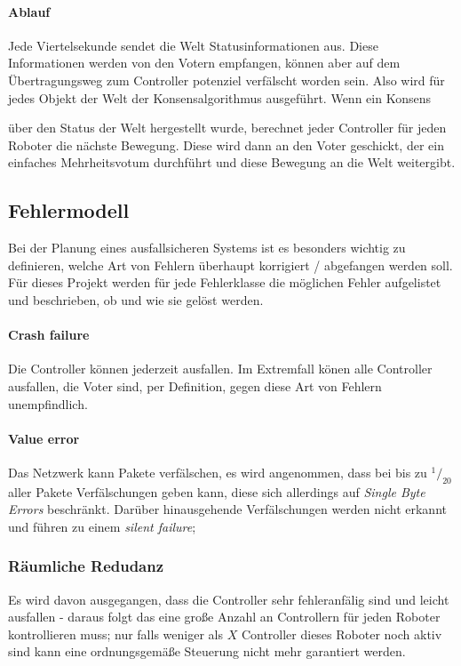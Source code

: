 \documentclass[
    12pt,
    bibliography=totoc,
    ngerman,
    enabledeprecatedfontcommands
]{scrartcl}
\begin{document}
\paragraph{Ablauf} Jede Viertelsekunde sendet die Welt Statusinformationen aus.  Diese Informationen werden von den Votern empfangen, k{\"{o}}nnen
aber auf dem {\"{U}}bertragungsweg zum Controller potenziel verf{\"{a}}lscht worden sein. Also wird f{\"{u}}r jedes Objekt der Welt der Konsensalgorithmus ausgef{\"{u}}hrt. Wenn ein Konsens {\"{u}ber den Status der Welt hergestellt wurde, berechnet 
jeder Controller f{\"{u}}r jeden Roboter die n{\"{a}}chste Bewegung. Diese wird dann an den Voter geschickt, der ein einfaches Mehrheitsvotum durchf{\"{u}}hrt und diese Bewegung an die Welt weitergibt.

\subsection{Fehlermodell} \label{error-model}
Bei der Planung eines ausfallsicheren Systems ist es besonders wichtig zu definieren, welche Art von Fehlern
{\"{u}}berhaupt korrigiert / abgefangen werden soll. F{\"{u}}r dieses Projekt werden f{\"{u}}r jede Fehlerklasse
die m{\"{o}}glichen Fehler aufgelistet und beschrieben, ob und wie sie gel{\"{o}}st werden.

\paragraph{Crash failure} Die Controller k{\"{o}}nnen jederzeit ausfallen. Im Extremfall k{\"{o}}nen alle Controller ausfallen, die Voter sind, per Definition, gegen diese Art von Fehlern unempfindlich.

\paragraph{Value error} Das Netzwerk kann Pakete verf{\"{a}}lschen, es wird angenommen, dass bei bis zu $^1/_{20}$ aller Pakete Verf{\"{a}}lschungen geben kann, diese sich allerdings auf \textit{Single Byte Errors} beschr{\"{a}}nkt.
Dar{\"{u}}ber hinausgehende Verf{\"{a}}lschungen werden nicht erkannt und f{\"{u}}hren zu einem \textit{silent failure}; 

\subsubsection{R{\"{a}}umliche Redudanz}
Es wird davon ausgegangen, dass die Controller sehr fehleranf{\"{a}}lig sind und leicht ausfallen - daraus folgt das eine gro{\ss}e
Anzahl an Controllern f{\"{u}}r jeden Roboter kontrollieren muss; nur falls weniger als $X$ Controller dieses Roboter noch aktiv
sind kann eine ordnungsgem{\"{a}}{\ss}e Steuerung nicht mehr garantiert werden.

}
\end{document}
